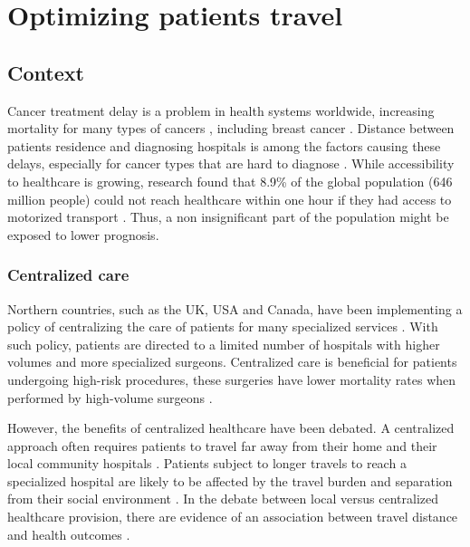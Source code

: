 \chapter{Optimizing patients travel}

\section{Context}

Cancer treatment delay is a problem in health systems worldwide, increasing mortality for many types of cancers \cite{hanna_mortality_2020}, including breast cancer \cite{caplan_delay_1992, williams_assessment_2015, pace_delays_2015}. Distance between patients residence and diagnosing hospitals is among the factors causing these delays, especially for cancer types that are hard to diagnose \cite{flytkjaer_virgilsen_cancer_2019}. While accessibility to healthcare is growing, research found that 8.9\% of the global population (646 million people) could not reach healthcare within one hour if they had access to motorized transport \cite{weiss_global_2020}. Thus, a non insignificant part of the population might be exposed to lower prognosis.

\subsection{Centralized care}

Northern countries, such as the UK, USA and Canada, have been implementing a policy of centralizing the care of patients for many specialized services \cite{kelly_are_2016}. With such policy, patients are directed to a limited number of hospitals with higher volumes and more specialized surgeons. Centralized care is beneficial for patients undergoing high-risk procedures, these surgeries have lower mortality rates when performed by high-volume surgeons \cite{pekala_centralization_2021,birkmeyer_surgeon_2003,finks_trends_2011,hollenbeck_getting_2007,goossens-laan_systematic_2011}.

However, the benefits of centralized healthcare have been debated. A centralized approach often requires patients to travel far away from their home and their local community hospitals \cite{woo_centralisation_2012}. Patients subject to longer travels to reach a specialized hospital are likely to be affected by the travel burden and separation from their social environment \cite{payne_impact_2000}. In the debate between local versus centralized healthcare provision, there are evidence of an association between travel distance and health outcomes \cite{kelly_are_2016}.

